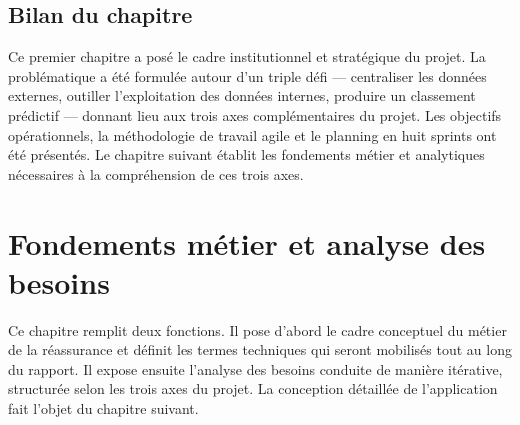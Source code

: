 \documentclass[12pt,a4paper]{report}
\begin{document}
\begin{figure}[H]
{%
}
\end{figure}

\section{Bilan du chapitre}

Ce premier chapitre a posé le cadre institutionnel et stratégique du projet. La
problématique a été formulée autour d'un triple défi --- centraliser les données
externes, outiller l'exploitation des données internes, produire un classement
prédictif --- donnant lieu aux trois axes complémentaires du projet. Les objectifs
opérationnels, la méthodologie de travail agile et le planning en huit sprints
ont été présentés. Le chapitre suivant établit les fondements métier et analytiques
nécessaires à la compréhension de ces trois axes.
\clearpage

\chapter{Fondements métier et analyse des besoins}
\label{chap:metier}

Ce chapitre remplit deux fonctions. Il pose d'abord le cadre conceptuel
du métier de la réassurance et définit les termes techniques qui seront mobilisés
tout au long du rapport. Il expose ensuite l'analyse des besoins conduite de manière
itérative, structurée selon les trois axes du projet. La conception détaillée de l'application fait l'objet du chapitre suivant.
\end{document}
